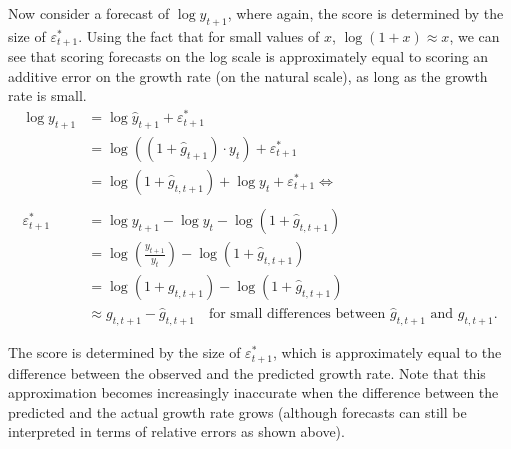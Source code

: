 \documentclass{article}
\begin{document}
Now consider a forecast of $\log y_{t+1}$, where again, the score is determined by the size of $\varepsilon^*_{t+1}$. Using the fact that for small values of $x$, $\log (1+ x) \approx x$, we can see that scoring forecasts on the log scale is approximately equal to scoring an additive error on the growth rate (on the natural scale), as long as the growth rate is small.
%
\begin{align}
\log y_{t+1}        &= \log \hat{y}_{t+1} + \varepsilon^*_{t+1} \nonumber\\
                    &= \log ((1 + \hat{g}_{t+1}) \cdot y_{t}) + \varepsilon^*_{t+1} \\
                    &= \log (1 + \hat{g}_{t, t+1}) + \log y_t + \varepsilon^*_{t+1} \Leftrightarrow \nonumber \\
\nonumber \\
\varepsilon^*_{t+1}  &= \log y_{t+1} -  \log y_t - \log (1 + \hat{g}_{t, t+1}) \nonumber \\    
                    &= \log \left(\frac{y_{t+1}}{y_t}\right) - \log (1 + \hat{g}_{t, t+1}) \\    
                    &= \log (1 + g_{t, t+1}) - \log (1 + \hat{g}_{t, t+1})\nonumber  \\   
                    &\approx g_{t, t+1} - \hat{g}_{t, t+1} \quad \text{for small differences between } \hat{g}_{t, t+1} \text{ and } g_{t, t+1}. \nonumber
\end{align}

The score is determined by the size of $\varepsilon^*_{t+1}$, which is approximately equal to the difference between the observed and the predicted growth rate. Note that this approximation becomes increasingly inaccurate when the difference between the predicted and the actual growth rate grows (although forecasts can still be interpreted in terms of relative errors as shown above). %

\end{document}
